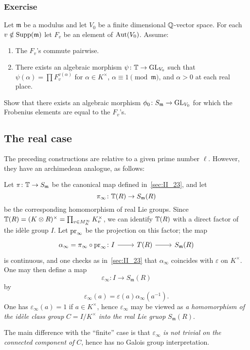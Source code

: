 \subsubsection*{Exercise}
Let $\mathfrak{m}$ be a modulus and let $V_0$ be a finite dimensional
$\mathbb{Q}$-vector space. For each $v \notin \operatorname{Supp}(\mathfrak{m})$ let $F_v$ be an
element of $\operatorname{Aut}(V_0)$. Assume:
\begin{enumerate}
	\item The $F_v$'s commute pairwise.
	\item There exists an algebraic morphism $\psi\colon \mathbb{T} \to \operatorname{GL}_{V_0}$
		such that $\psi(\alpha) = \prod F_v^{v(\alpha)}$ for $\alpha
		\in K^\times$, $\alpha \equiv 1 \pmod{\mathfrak{m}}$, and
		$\alpha > 0$ at each real place.
\end{enumerate}
Show that there exists an algebraic morphism $\phi_0 \colon S_{\mathfrak{m}}
\to \operatorname{GL}_{V_0}$ for which the Frobenius elements are equal to the $F_v$'s.

\subsection{The real case}
The preceding constructions are relative to a given prime number $\ell$.
However, they have an archimedean analogue, as follows: 

Let $\pi \colon \mathbb{T} \to S_\mathfrak{m}$ be the canonical map defined 
in~\ref{sec:II_23}, and let 
\[
	\pi_{\infty} \colon \mathbb{T}(R) \to S_\mathfrak{m}(R)
\]
be the corresponding homomorphism of real Lie groups. Since $\mathbb{T}(R) = (K
\otimes R)^{\times} = \prod_{v \in M_K^\infty} K_v^{\times}$, we can identify
$\mathbb{T}(R)$ with a direct factor of the idèle group $I$. Let $\operatorname{pr}_\infty$ be the
projection on this factor; the map 
\dpage
\[\begin{tikzcd}
	\alpha_\infty = \pi_\infty \circ \pr_\infty \colon I \arrow[r] & T(R) 
	\arrow[r] & S_\mathfrak{m}(R)
\end{tikzcd}\]
is continuous, and one checks as in~\ref{sec:II_23} that $\alpha_\infty$ 
coincides with $\varepsilon$ on $K^{\times}$. One may then define a map
\[
	\varepsilon_{\infty} \colon I \rightarrow S_{\mathfrak{m}}(R)
\]
by 
\[
	\varepsilon_\infty(a) = \varepsilon(a)\alpha_\infty(a^{-1}).
\]
One has $\varepsilon_\infty(a) = 1$ if $a \in K^{\times}$, hence 
$\varepsilon_\infty$ may be viewed as \emph{a homomorphism of the idèle 
class group} $C = I/K^{\times}$ \emph{into the real Lie gruop} $S_\mathfrak{m}
(R)$.

The main difference with the ``finite'' case is that $\varepsilon_\infty$ 
\emph{is not trivial on the connected component of} $C$, hence has no Galois 
group interpretation.

